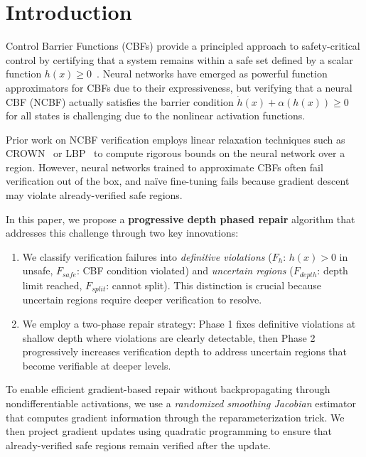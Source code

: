 \section{Introduction}

Control Barrier Functions (CBFs) provide a principled approach to safety-critical control by certifying that a system remains within a safe set defined by a scalar function $h(x) \geq 0$~\citep{ames2019control}. Neural networks have emerged as powerful function approximators for CBFs due to their expressiveness, but verifying that a neural CBF (NCBF) actually satisfies the barrier condition $\dot{h}(x) + \alpha(h(x)) \geq 0$ for all states is challenging due to the nonlinear activation functions.

Prior work on NCBF verification employs linear relaxation techniques such as CROWN~\citep{ruppert1998ball, hwang2020crown} or LBP~\citep{liu2021 certify} to compute rigorous bounds on the neural network over a region. However, neural networks trained to approximate CBFs often fail verification out of the box, and na\"ive fine-tuning fails because gradient descent may violate already-verified safe regions.

In this paper, we propose a \textbf{progressive depth phased repair} algorithm that addresses this challenge through two key innovations:

\begin{enumerate}
    \item We classify verification failures into \emph{definitive violations} ($F_h$: $h(x) > 0$ in unsafe, $F_{safe}$: CBF condition violated) and \emph{uncertain regions} ($F_{depth}$: depth limit reached, $F_{split}$: cannot split). This distinction is crucial because uncertain regions require deeper verification to resolve.
    
    \item We employ a two-phase repair strategy: Phase 1 fixes definitive violations at shallow depth where violations are clearly detectable, then Phase 2 progressively increases verification depth to address uncertain regions that become verifiable at deeper levels.
\end{enumerate}

To enable efficient gradient-based repair without backpropagating through nondifferentiable activations, we use a \emph{randomized smoothing Jacobian} estimator that computes gradient information through the reparameterization trick. We then project gradient updates using quadratic programming to ensure that already-verified safe regions remain verified after the update.

